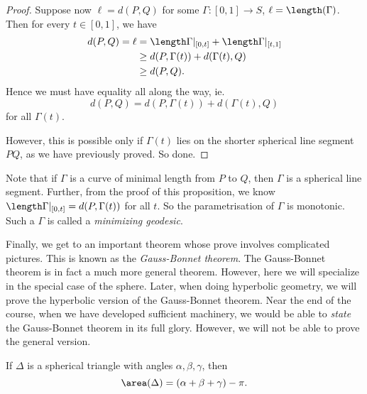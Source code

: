 \documentclass[a4paper]{article}
\begin{document}
\begin{proof}
  Suppose now $\ell = d(P, Q)$ for some $\Gamma: [0, 1] \to S$, $\ell = \length(\Gamma)$. Then for every $t \in [0, 1]$, we have
  \begin{align*}
    d(P, Q) = \ell &= \length \Gamma|_{[0, t]} + \length \Gamma|_{[t, 1]} \\
    &\geq d(P, \Gamma(t)) + d(\Gamma(t), Q)\\
    &\geq d(P, Q).
  \end{align*}
  Hence we must have equality all along the way, ie.
  \[
    d(P, Q) = d(P, \Gamma(t)) + d(\Gamma(t), Q)
  \]
  for all $\Gamma(t)$.

  However, this is possible only if $\Gamma(t)$ lies on the shorter spherical line segment $PQ$, as we have previously proved. So done.
\end{proof}

Note that if $\Gamma$ is a curve of minimal length from $P$ to $Q$, then $\Gamma$ is a spherical line segment. Further, from the proof of this proposition, we know $\length \Gamma|_{[0, t]} = d(P, \Gamma(t))$ for all $t$. So the parametrisation of $\Gamma$ is monotonic. Such a $\Gamma$ is called a \emph{minimizing geodesic}.

Finally, we get to an important theorem whose prove involves complicated pictures. This is known as the \emph{Gauss-Bonnet theorem}. The Gauss-Bonnet theorem is in fact a much more general theorem. However, here we will specialize in the special case of the sphere. Later, when doing hyperbolic geometry, we will prove the hyperbolic version of the Gauss-Bonnet theorem. Near the end of the course, when we have developed sufficient machinery, we would be able to \emph{state} the Gauss-Bonnet theorem in its full glory. However, we will not be able to prove the general version.

\begin{prop}
  If $\Delta$ is a spherical triangle with angles $\alpha, \beta, \gamma$, then
  \[
    \area (\Delta) = (\alpha + \beta + \gamma) - \pi.
  \]
\end{prop}
\end{document}
